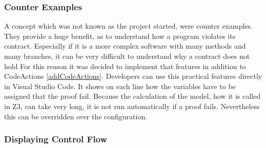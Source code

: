 \subsubsection{Counter Examples}
A concept which was not known as the project started, were counter examples. They provide a huge benefit, as to understand how a program violates its contract. Especially if it is a more complex software with many methods and many branches, it can be very difficult to understand why a contract does not hold\newline
For this reason it was decided to implement that features in addition to CodeActions \ref{addCodeActions}. 
Developers can use this practical features directly in Visual Studio Code. It shows on each line how the variables have to be assigned that the proof fail. \newline
Because the calculation of the model, how it is called in Z3, can take very long, it is not run automatically if a proof fails. Nevertheless this can be overridden over the configuration. 
 
\subsubsection{Displaying Control Flow}
